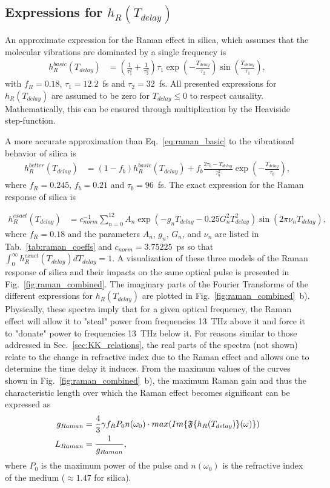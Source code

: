\subsection{Expressions for $h_R(T_{delay})$}
An approximate expression for the Raman effect in silica, which assumes that the molecular vibrations are dominated by a single frequency is 
\begin{align}
\label{eq:raman_basic}
    h_R^{basic}(T_{delay})&= \left(\frac{1}{\tau_1^{2}}+\frac{1}{\tau_2^{2}} \right)\tau_1\exp\left(-\frac{T_{delay}}{\tau_2}\right)\sin\left(\frac{T_{delay}}{\tau_1}\right),
\end{align}
with $f_R=0.18$, $\tau_1=12.2$~fs and $\tau_2=32$~fs. All presented expressions for $h_R(T_{delay})$ are assumed to be zero for $T_{delay}\leq0$ to respect causality. Mathematically, this can be ensured through multiplication by the Heaviside step-function.

A more accurate approximation than Eq.~\ref{eq:raman_basic} to the vibrational behavior of silica is  
\begin{align}
\label{eq:raman_new}
    h_R^{better}(T_{delay})&= (1-f_b) h_R^{basic}(T_{delay})+f_b\frac{2\tau_b-T_{delay}}{\tau_b^2}\exp\left(-\frac{T_{delay}}{\tau_b}\right),
\end{align}
where $f_R=0.245$, $f_b=0.21$ and $\tau_b=96$~fs. The exact expression for the Raman response of silica is

\begin{align}
\label{eq:Raman_exact}
    h_R^{exact}(T_{delay})&=c^{-1}_{norm}\sum_{n=0}^{12}A_n\exp\left(- g_nT_{delay}-0.25G_n^2T^2_{delay}  \right)\sin\left(2\pi \nu_nT_{delay} \right),
\end{align}
where $f_R=0.18$ and the parameters $A_n$, $g_n$, $G_n$, and $\nu_n$ are listed in Tab.~\ref{tab:raman_coeffs} and $c_{norm}=3.75225$~ps so that $\int_0^\infty h_R^{exact}(T_{delay}) dT_{delay}=1$. A visualization of these three models of the Raman response of silica and their impacts on the same optical pulse is presented in Fig.~\ref{fig:raman_combined}. The imaginary parts of the Fourier Transforms of the different expressions for $h_R(T_{delay})$ are plotted in Fig.~\ref{fig:raman_combined}~b). Physically, these spectra imply that for a given optical frequency, the Raman effect will allow it to "steal" power from frequencies 13~THz above it and force it to "donate" power to frequencies 13~THz below it. For reasons similar to those addressed in Sec.~\ref{sec:KK_relations}, the real parts of the spectra (not shown) relate to the change in refractive index due to the Raman effect and allows one to determine the time delay it induces. From the maximum values of the curves shown in Fig.~\ref{fig:raman_combined}~b), the maximum Raman gain and thus the characteristic length over which the Raman effect becomes significant can be expressed as
\begin{align}
    g_{Raman} &= \frac{4}{3} \gamma f_R P_0 n(\omega_0)\cdot max(  Im\{ \mathfrak{F} \{ h_R(T_{delay}) \}(\omega) \} )\\ 
    L_{Raman} &= \frac{1}{g_{Raman}},
\end{align}
where $P_0$ is the maximum power of the pulse and $n(\omega_0)$ is the refractive index of the medium ($\approx 1.47$ for silica). 


